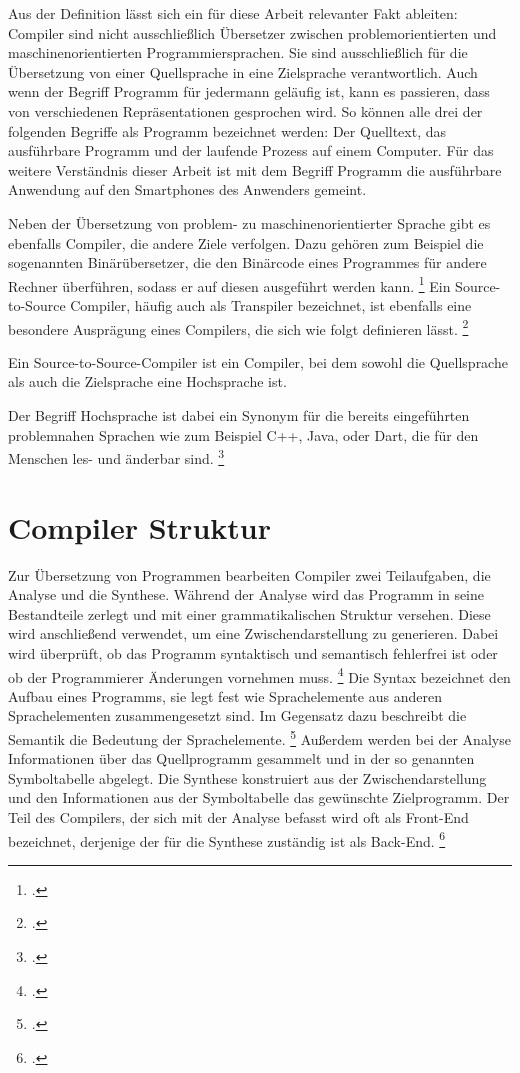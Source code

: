 Aus der Definition lässt sich ein für diese Arbeit relevanter Fakt ableiten: Compiler sind nicht ausschließlich Übersetzer zwischen problemorientierten und maschinenorientierten Programmiersprachen.  Sie sind ausschließlich für die Übersetzung von einer Quellsprache in eine Zielsprache verantwortlich.  Auch wenn der Begriff Programm für jedermann geläufig ist,  kann es  passieren,  dass von verschiedenen Repräsentationen gesprochen wird.  So können alle drei der folgenden Begriffe als Programm bezeichnet werden: Der Quelltext,  das ausführbare Programm und der laufende Prozess auf einem Computer.  Für das weitere Verständnis dieser Arbeit ist mit dem Begriff Programm die ausführbare Anwendung auf den Smartphones des Anwenders gemeint.  

Neben der Übersetzung von problem- zu maschinenorientierter Sprache gibt es ebenfalls Compiler, die andere Ziele verfolgen. Dazu gehören zum Beispiel die sogenannten Binärübersetzer,  die den Binärcode eines Programmes für andere Rechner überführen,  sodass er auf diesen ausgeführt werden kann.  \footcite[Vgl.][S. 27]{Ullmann2008} Ein
Source-to-Source Compiler,  häufig auch als \glqq Transpiler\grqq{} bezeichnet,  ist ebenfalls eine besondere Ausprägung eines Compilers, die sich wie folgt definieren lässt.  \footcite[Vgl.][S. 1629]{IJCSIT2015}
\begin{Def}
Ein Source-to-Source-Compiler ist ein Compiler, bei dem sowohl die Quellsprache als auch die Zielsprache eine Hochsprache ist.
\end{Def}
\vspace{-1em}

Der Begriff Hochsprache ist dabei ein Synonym für die bereits eingeführten problemnahen Sprachen wie zum Beispiel C++,  Java,  \Csharp{} oder Dart,  die für den Menschen les- und änderbar sind. \footcite[Vgl.][S. 9]{Eisenecker2008} 

\section{Compiler Struktur}
Zur Übersetzung von Programmen bearbeiten Compiler zwei Teilaufgaben,  die Analyse und die Synthese. Während der Analyse wird das Programm in seine Bestandteile zerlegt und mit einer grammatikalischen Struktur versehen. Diese wird anschließend verwendet, um eine Zwischendarstellung zu generieren.  Dabei wird überprüft, ob das Programm syntaktisch und semantisch fehlerfrei ist oder ob der Programmierer Änderungen vornehmen muss. \footcite[Vgl.][S. 6f]{Ullmann2008} Die Syntax bezeichnet den Aufbau eines Programms,  sie legt fest wie Sprachelemente aus anderen Sprachelementen zusammengesetzt sind.  Im Gegensatz dazu beschreibt die Semantik die Bedeutung der Sprachelemente. \footcite[Vgl.][S. 36]{Schneider1975}  Außerdem werden bei der Analyse Informationen über das Quellprogramm gesammelt und in der so genannten Symboltabelle abgelegt.  Die Synthese konstruiert aus der Zwischendarstellung und den Informationen aus der Symboltabelle das gewünschte Zielprogramm.  Der Teil des Compilers, der sich mit der Analyse befasst wird oft als Front-End bezeichnet, derjenige der für die Synthese zuständig ist als Back-End.  \footcite[Vgl.][S. 6f]{Ullmann2008}

